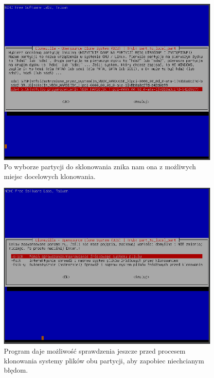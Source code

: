 \documentclass[0.82pt,a4paper]{article}
\begin{document}
    \begin{figure}[H]
        \centering
        \includegraphics[width=0.8\linewidth]{media/Clonezilla/clone7.PNG}
        \caption[clone gdzie]{Po wyborze partycji do sklonowania znika nam ona z możliwych miejsc docelowych klonowania.}
        \label{fig:clone7}
    \end{figure}
    
    \begin{figure}[H]
        \centering
        \includegraphics[width=0.8\linewidth]{media/Clonezilla/clone8.PNG}
        \caption[clone naprawa]{Program daje możliwość sprawdzenia jeszcze przed procesem klonowania systemy plików obu partycji, aby zapobiec niechcianym błędom.}
        \label{fig:clone8}
    \end{figure}
    
\end{document}
